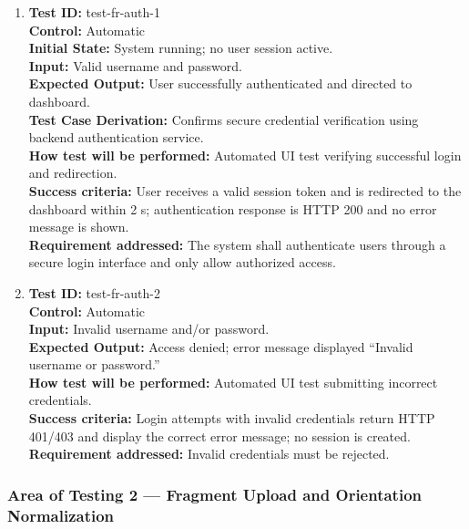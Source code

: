 \documentclass[12pt, titlepage]{article}
\begin{document}
\begin{enumerate}
    \item
    \textbf{Test ID:} test-fr-auth-1\\
    \textbf{Control:} Automatic\\
    \textbf{Initial State:} System running; no user session active.\\
    \textbf{Input:} Valid username and password.\\
    \textbf{Expected Output:} User successfully authenticated and directed to dashboard.\\
    \textbf{Test Case Derivation:} Confirms secure credential verification using backend authentication service.\\
    \textbf{How test will be performed:} Automated UI test verifying successful login and redirection.\\
    \textbf{Success criteria:} User receives a valid session token and is redirected to the dashboard within 2 s; authentication response is HTTP 200 and no error message is shown.\\
    \textbf{Requirement addressed:} The system shall authenticate users through a secure login interface and only allow authorized access.\\

    \item
    \textbf{Test ID:} test-fr-auth-2\\
    \textbf{Control:} Automatic\\
    \textbf{Input:} Invalid username and/or password.\\
    \textbf{Expected Output:} Access denied; error message displayed ``Invalid username or password.''\\
    \textbf{How test will be performed:} Automated UI test submitting incorrect credentials.\\
    \textbf{Success criteria:} Login attempts with invalid credentials return HTTP 401/403 and display the correct error message; no session is created.\\
    \textbf{Requirement addressed:} Invalid credentials must be rejected.\\
\end{enumerate}

\subsubsection{Area of Testing 2 — Fragment Upload and Orientation Normalization}
\end{document}
